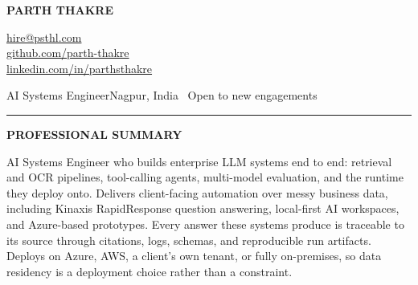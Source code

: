 \documentclass[a4paper,10pt]{article}
\newcommand{\sectionbar}[1]{%
  \vspace{7pt}
  \begin{tcolorbox}[
    enhanced,
    colback=resumeInk,
    colframe=resumeInk,
    boxrule=0pt,
    arc=0pt,
    left=7pt,
    right=7pt,
    top=4pt,
    bottom=4pt,
    width=\linewidth,
  ]
    {\color{white}\bfseries\fontsize{9.5}{11}\selectfont #1}
  \end{tcolorbox}
  \vspace{3pt}
}
\begin{document}
\noindent
\begin{minipage}[t]{0.58\linewidth}
  \vspace{0pt}
  {\fontsize{24}{26}\selectfont\bfseries PARTH THAKRE}
\end{minipage}
\hfill
\begin{minipage}[t]{0.38\linewidth}
  \vspace{0pt}
  \raggedleft
  {\footnotesize \href{mailto:hire@psthl.com}{hire@psthl.com}}\\
  {\footnotesize \href{https://github.com/parth-thakre}{github.com/parth-thakre}}\\
  {\footnotesize \href{https://www.linkedin.com/parthsthakre/}{linkedin.com/in/parthsthakre}}
\end{minipage}

\vspace{2pt}
{\Large AI Systems Engineer}\hfill{\small Nagpur, India \textbullet\ Open to new engagements}\\[-2pt]
\textcolor{resumeRule}{\rule{\linewidth}{1.2pt}}
\vspace{2pt}

\sectionbar{PROFESSIONAL SUMMARY}
{\small\raggedright
AI Systems Engineer who builds enterprise LLM systems end to end: retrieval and OCR pipelines, tool-calling agents, multi-model evaluation, and the runtime they deploy onto. Delivers client-facing automation over messy business data, including Kinaxis RapidResponse question answering, local-first AI workspaces, and Azure-based prototypes. Every answer these systems produce is traceable to its source through citations, logs, schemas, and reproducible run artifacts. Deploys on Azure, AWS, a client's own tenant, or fully on-premises, so data residency is a deployment choice rather than a constraint.
\par}
\end{document}
